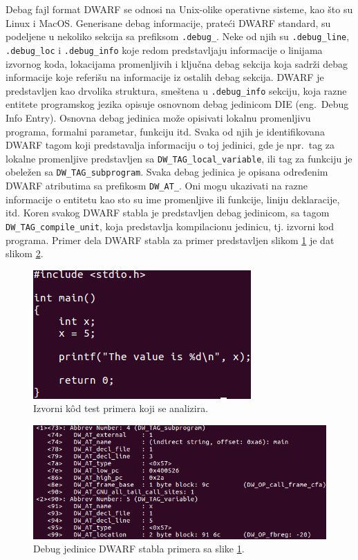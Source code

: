 \documentclass[12pt,oneside]{memoir}
\begin{document}
Debag fajl format DWARF se odnosi na Unix-olike operativne sisteme, kao što su Linux i MacOS. Generisane debag informacije, prateći DWARF standard, su podeljene u nekoliko sekcija sa prefiksom \texttt{.debug\_}. Neke od njih su \texttt{.debug\_line}, \texttt{.debug\_loc} i \texttt{.debug\_info} koje redom predstavljaju informacije o linijama izvornog koda, lokacijama promenljivih i ključna debag sekcija koja sadrži debag informacije koje referišu na informacije iz ostalih debag sekcija.
DWARF je predstavljen kao drvolika struktura, smeštena u \texttt{.debug\_info} sekciju,  koja razne entitete programskog jezika opisuje osnovnom debag jedinicom DIE (eng.~Debug Info Entry). Osnovna debag jedinica može opisivati lokalnu promenljivu programa, formalni parametar, funkciju itd. Svaka od njih je identifikovana DWARF tagom koji predstavalja informaciju o toj jedinici, gde je npr.~tag za lokalne promenljive predstavljen sa \texttt{DW\_TAG\_local\_variable}, ili tag za funkciju je obeležen sa \texttt{DW\_TAG\_subprogram}. Svaka debag jedinica je opisana određenim DWARF atributima sa prefikosm \texttt{DW\_AT\_}. Oni mogu ukazivati na razne informacije o entitetu kao sto su ime promenljive ili funkcije, liniju deklaracije, itd. Koren svakog DWARF stabla je predstavljen debag jedinicom, sa tagom  \texttt{DW\_TAG\_compile\_unit}, koja predstavlja kompilacionu jedinicu, tj. izvorni kod programa. Primer dela DWARF stabla za primer predstavljen slikom \ref{fig:testPrimer} je dat slikom \ref{fig:dwarfPrimer}.

\begin{figure}[h!]
	\begin{center}
		\includegraphics[scale=0.8]{slike/testPrimer.png}
	\end{center}
	\caption{Izvorni k\^{o}d test primera koji se analizira.}
	\label{fig:testPrimer}
\end{figure}

\begin{figure}[h!]
	\begin{center}
		\includegraphics[scale=0.6]{slike/dwarfPrimer.png}
	\end{center}
	\caption{Debug jedinice DWARF stabla primera sa slike \ref{fig:testPrimer}.}
	\label{fig:dwarfPrimer}
\end{figure}
\end{document}
